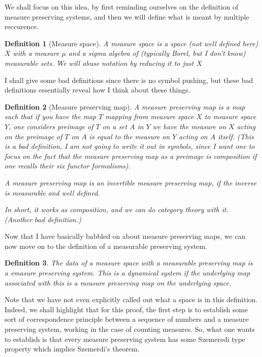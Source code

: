 \documentclass[12pt]{article}
\newtheorem{definition}{Definition}
\begin{document}
We shall focus on this idea, by first reminding ourselves on the definition of measure preserving systems, and then we will define what is meant by multiple reccurence.

\begin{definition}[Measure space]
    A measure space is a space (not well defined here) $X$ with a measure $\mu$ and a sigma algebra of (typically Borel, but I don't know) measurable sets. We will abuse notation by reducing it to just $X$
\end{definition}

I shall give some bad definitions since there is no symbol pushing, but these bad definitions essentially reveal how I think about these things.

\begin{definition}[Measure preserving map]
    A measure preserving map is a map such that if you have the map $T$ mapping from measure space $X$ to measure space $Y$, one considers preimage of $T$ on a set $A$ in $Y$ we have the measure on $X$ acting on the preimage of $T$ on $A$ is equal to the measure on $Y$ acting on $A$ itself. (This is a bad definition, I am not going to write it out in symbols, since I want one to focus on the fact that the measure preserving map as a preimage is composition if one recalls their six functor formalisms).

    A measure preserving map is an invertible measure preserving map, if the inverse is measurable and well defined. 
    
    In short, it works as composition, and we can do category theory with it. (Another bad definition.)
\end{definition}

Now that I have basically babbled on about measure preserving maps, we can now move on to the definition of a measurable preserving system. 

\begin{definition}
    The data of a measure space with a measurable preserving map is a emasure preserving system. This is a dynamical system if the underlying map associated with this is a measure preserving map on the underlying space.
\end{definition}

Note that we have not even explicitly called out what a space is in this definition. Indeed, we shall highlight that for this proof, the first step is to establish some sort of correspondence principle between a sequence of numbers and a measure preserving system, working in the case of counting measures. So, what one wants to establish is that every measure preserving system has some Szemeredi type property which implies Szemerdi's theorem. 
\end{document}
